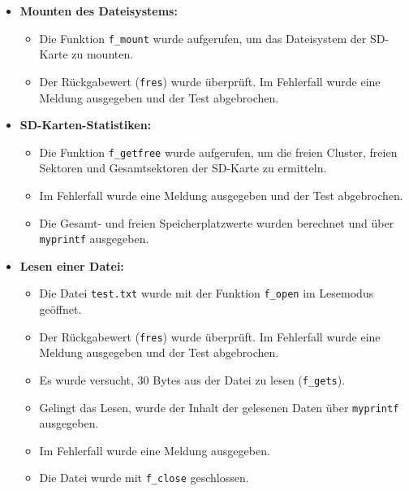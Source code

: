 \begin{itemize}
	\item \textbf{Mounten des Dateisystems:}
	\begin{itemize}
		\item Die Funktion \texttt{f\_mount} wurde aufgerufen, um das Dateisystem der SD-Karte zu mounten.
		\item Der Rückgabewert (\texttt{fres}) wurde überprüft. Im Fehlerfall wurde eine Meldung ausgegeben und der Test abgebrochen.
	\end{itemize}
	
	\item \textbf{SD-Karten-Statistiken:}
	\begin{itemize}
		\item Die Funktion \texttt{f\_getfree} wurde aufgerufen, um die freien Cluster, freien Sektoren und Gesamtsektoren der SD-Karte zu ermitteln.
		\item Im Fehlerfall wurde eine Meldung ausgegeben und der Test abgebrochen.
		\item Die Gesamt- und freien Speicherplatzwerte wurden berechnet und über \texttt{myprintf} ausgegeben.
	\end{itemize}
	
	\item \textbf{Lesen einer Datei:}
	\begin{itemize}
		\item Die Datei \texttt{test.txt} wurde mit der Funktion \texttt{f\_open} im Lesemodus geöffnet.
		\item Der Rückgabewert (\texttt{fres}) wurde überprüft. Im Fehlerfall wurde eine Meldung ausgegeben und der Test abgebrochen.
		\item Es wurde versucht, 30 Bytes aus der Datei zu lesen (\texttt{f\_gets}).
		\item Gelingt das Lesen, wurde der Inhalt der gelesenen Daten über \texttt{myprintf} ausgegeben.
		\item Im Fehlerfall wurde eine Meldung ausgegeben.
		\item Die Datei wurde mit \texttt{f\_close} geschlossen.
	\end{itemize}
	

\end{itemize}
